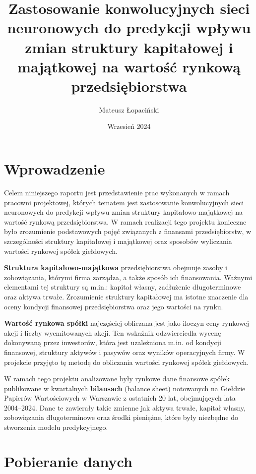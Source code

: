 \documentclass[12pt]{article}
\title{Zastosowanie konwolucyjnych sieci neuronowych do predykcji wpływu zmian struktury kapitałowej i majątkowej na wartość rynkową przedsiębiorstwa}
\author{Mateusz Łopaciński}
\date{Wrzesień 2024}
\begin{document}
\maketitle

\tableofcontents
\vspace{1cm} %

\newpage %
\section{Wprowadzenie}

Celem niniejszego raportu jest przedstawienie prac wykonanych w ramach pracowni projektowej, których tematem jest zastosowanie konwolucyjnych sieci neuronowych do predykcji wpływu zmian struktury kapitałowo-majątkowej na wartość rynkową przedsiębiorstwa. W ramach realizacji tego projektu konieczne było zrozumienie podstawowych pojęć związanych z finansami przedsiębiorstw, w szczególności struktury kapitałowej i majątkowej oraz sposobów wyliczania wartości rynkowej spółek giełdowych.

\textbf{Struktura kapitałowo-majątkowa} przedsiębiorstwa obejmuje zasoby i zobowiązania, którymi firma zarządza, a także sposób ich finansowania. Ważnymi elementami tej struktury są m.in.: kapitał własny, zadłużenie długoterminowe oraz aktywa trwałe. Zrozumienie struktury kapitałowej ma istotne znaczenie dla oceny kondycji finansowej przedsiębiorstwa oraz jego wartości na rynku.

\textbf{Wartość rynkowa spółki} najczęściej obliczana jest jako iloczyn ceny rynkowej akcji i liczby wyemitowanych akcji. Ten wskaźnik odzwierciedla wycenę dokonywaną przez inwestorów, która jest uzależniona m.in. od kondycji finansowej, struktury aktywów i pasywów oraz wyników operacyjnych firmy. W projekcie przyjęto tę metodę do obliczania wartości rynkowej spółek giełdowych.

W ramach tego projektu analizowane były rynkowe dane finansowe spółek publikowane w kwartalnych \textbf{bilansach} (balance sheet) notowanych na Giełdzie Papierów Wartościowych w Warszawie z ostatnich 20 lat, obejmujących lata 2004–2024. Dane te zawierały takie zmienne jak aktywa trwałe, kapitał własny, zobowiązania długoterminowe oraz środki pieniężne, które były niezbędne do stworzenia modelu predykcyjnego.

\newpage %
\section{Pobieranie danych}
\end{document}
